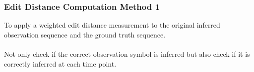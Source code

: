 
\begin{frame}
\frametitle{Edit Distance Computation Method 1}

To apply a weighted edit distance measurement to the original inferred observation sequence and the ground truth sequence.\\~\\

Not only check if the correct observation symbol is inferred but also check if it is correctly inferred at each time point.

\end{frame}
